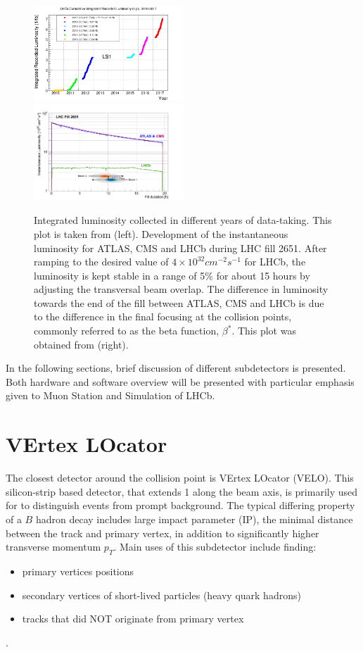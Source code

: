 \begin{figure}
	\centering
	\includegraphics[width = 0.5\textwidth]{figs/detector/intlumi.png}%
        \includegraphics[width = 0.5\textwidth]{figs/detector/lumicompare.png}
	\caption{Integrated luminosity collected in different years of data-taking. This plot is taken from \cite{lumiover} (left). Development of the instantaneous luminosity for \Gls{ATLAS}, \Gls{CMS} and \Gls{LHCb} during LHC fill 2651. After ramping to the desired value of $4\times10^{32}cm^{-2}s^{-1}$
for LHCb, the luminosity is kept stable in a range of 5$\%$ for about 15 hours by adjusting the transversal beam overlap. The difference in luminosity towards the end of the fill between ATLAS, \Gls{CMS} and \Gls{LHCb} is due to the difference in the final focusing at the collision points, commonly referred to as the beta function, $\beta^{*}$. This plot was obtained from \cite{LHCb-DP-2014-002} (right).}
	\label{fig:lhcbintlumi}
\end{figure}

In the following sections, brief discussion of different subdetectors is presented. Both hardware and software overview will be presented with particular emphasis given to Muon Station and Simulation of LHCb.

\section{VErtex LOcator}
The closest detector around the collision point is VErtex LOcator (\Gls{VELO}). This silicon-strip based detector, that extends 1 \m along the beam axis, is primarily used for to distinguish events from prompt background. The typical differing property of a $B$ hadron decay includes large impact parameter (\Gls{IP}), the minimal distance between the track and primary vertex, in addition to significantly higher transverse momentum $p_{T}$. Main uses of this subdetector include finding: 
\begin{itemize}
\item primary vertices positions
\item secondary vertices of short-lived particles (heavy quark hadrons)
\item tracks that did NOT originate from primary vertex
\end{itemize}.


